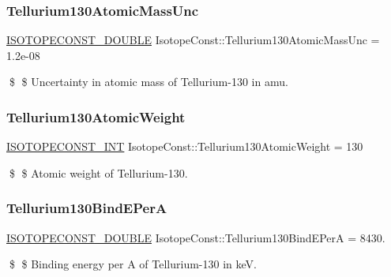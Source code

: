 \subsubsection{\texorpdfstring{Tellurium130\+Atomic\+Mass\+Unc}{Tellurium130AtomicMassUnc}}
{\footnotesize\ttfamily \mbox{\hyperlink{group___isotope_const-_macros_ga8f45a7272ce02c0b4c65c44636ed719a}{I\+S\+O\+T\+O\+P\+E\+C\+O\+N\+S\+T\+\_\+\+D\+O\+U\+B\+LE}} Isotope\+Const\+::\+Tellurium130\+Atomic\+Mass\+Unc = 1.\+2e-\/08}

\$ \$ Uncertainty in atomic mass of Tellurium-\/130 in amu. \mbox{\label{group___isotope_const-_tellurium-_te130_ga4d574b9259f14a6344fe8b89da03e4e5}} 
\subsubsection{\texorpdfstring{Tellurium130\+Atomic\+Weight}{Tellurium130AtomicWeight}}
{\footnotesize\ttfamily \mbox{\hyperlink{group___isotope_const-_macros_ga5f18360b3e99483a35c32d789e62621c}{I\+S\+O\+T\+O\+P\+E\+C\+O\+N\+S\+T\+\_\+\+I\+NT}} Isotope\+Const\+::\+Tellurium130\+Atomic\+Weight = 130}

\$ \$ Atomic weight of Tellurium-\/130. \mbox{\label{group___isotope_const-_tellurium-_te130_gad85723d4cb8f5eeb67c2f4cd93e872ab}} 
\subsubsection{\texorpdfstring{Tellurium130\+Bind\+E\+PerA}{Tellurium130BindEPerA}}
{\footnotesize\ttfamily \mbox{\hyperlink{group___isotope_const-_macros_ga8f45a7272ce02c0b4c65c44636ed719a}{I\+S\+O\+T\+O\+P\+E\+C\+O\+N\+S\+T\+\_\+\+D\+O\+U\+B\+LE}} Isotope\+Const\+::\+Tellurium130\+Bind\+E\+PerA = 8430.}

\$ \$ Binding energy per A of Tellurium-\/130 in keV. \mbox{\label{group___isotope_const-_tellurium-_te130_ga9f05e871a8b58822dde6a29ea5a83d02}} 
